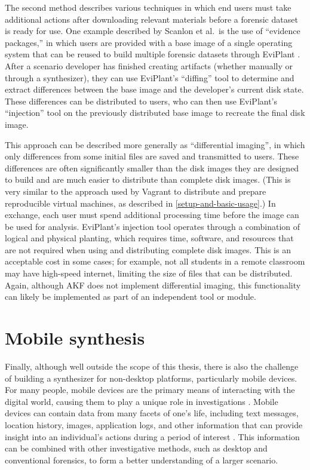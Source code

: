 The second method describes various techniques in which end users must
take additional actions after downloading relevant materials before a
forensic dataset is ready for use. One example described by Scanlon et
al.~is the use of ``evidence packages,'' in which users are provided
with a base image of a single operating system that can be reused to
build multiple forensic datasets through EviPlant
\cite{scanlonEviPlantEfficientDigital2017}. After a scenario
developer has finished creating artifacts (whether manually or through a
synthesizer), they can use EviPlant's ``diffing'' tool to determine and
extract differences between the base image and the developer's current
disk state. These differences can be distributed to users, who can then
use EviPlant's ``injection'' tool on the previously distributed base
image to recreate the final disk image.

This approach can be described more generally as ``differential
imaging'', in which only differences from some initial files are saved
and transmitted to users. These differences are often significantly
smaller than the disk images they are designed to build and are much
easier to distribute than complete disk images. (This is very similar to
the approach used by Vagrant to distribute and prepare reproducible
virtual machines, as described in \autoref{setup-and-basic-usage}.) In exchange, each user must spend additional
processing time before the image can be used for analysis. EviPlant's
injection tool operates through a combination of logical and physical
planting, which requires time, software, and resources that are not
required when using and distributing complete disk images. This is an
acceptable cost in some cases; for example, not all students in a remote
classroom may have high-speed internet, limiting the size of files that
can be distributed. Again, although AKF does not implement differential
imaging, this functionality can likely be implemented as part of an
independent tool or module.

\section{Mobile synthesis}\label{mobile-synthesis}

Finally, although well outside the scope of this thesis, there is also
the challenge of building a synthesizer for non-desktop platforms,
particularly mobile devices. For many people, mobile devices are the
primary means of interacting with the digital world, causing them to
play a unique role in investigations
\cite{chernyshevMobileForensicsAdvances2017}. Mobile devices can
contain data from many facets of one's life, including text messages,
location history, images, application logs, and other information that
can provide insight into an individual's actions during a period of
interest \cite{sutiknoCapabilitiesCellebriteUniversal2024}. This
information can be combined with other investigative methods, such as
desktop and conventional forensics, to form a better understanding of a
larger scenario.

